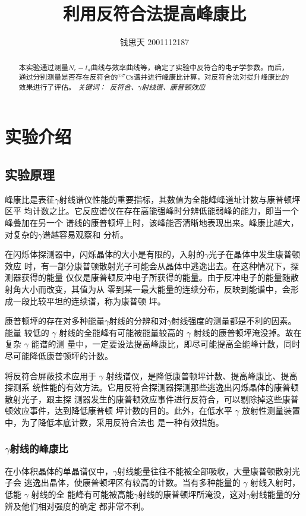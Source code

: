 \documentclass{article}
\title{利用反符合法提高峰康比}
\author{钱思天 2001112187}
\begin{document}
    \maketitle
    \begin{abstract}
        本实验通过测量$N_c-t_d$曲线与效率曲线等，确定了实验中反符合的电子学参数。而后，通过分别测量是否存在反符合的$^{137}\text{Cs}$谱并进行峰康比计算，对反符合法对提升峰康比的效果进行了评估。
        \newline
        \newline
        {\emph{ 关键词：\ 反符合、$\gamma$射线谱、康普顿效应 }\rm}

    \end{abstract}

    \section{实验介绍}
    \subsection{实验原理}
    峰康比是表征$\gamma$射线谱仪性能的重要指标，其数值为全能峰峰道址计数与康普顿坪区平 均计数之比。它反应谱仪在存在高能强峰时分辨低能弱峰的能力，即当一个峰叠加在另一个 谱线的康普顿坪上时，该峰能否清晰地表现出来。峰康比越大，对复杂的$\gamma$谱越容易观察和 分析。

在闪烁体探测器中，闪烁晶体的大小是有限的，入射的$\gamma$光子在晶体中发生康普顿效应 时，有一部分康普顿散射光子可能会从晶体中逃逸出去。在这种情况下，探测器获得的能量 仅仅是康普顿反冲电子所获得的能量。由于反冲电子的能量随散射角大小而改变，其值为从 零到某一最大能量的连续分布，反映到能谱中，会形成一段比较平坦的连续谱，称为康普顿 坪。

康普顿坪的存在对多种能量$\gamma$射线的分辨和对$\gamma$射线强度的测量都是不利的因素。能量 较低的 $\gamma$ 射线的全能峰有可能被能量较高的 $\gamma$ 射线的康普顿坪淹没掉。故在复杂 $\gamma$ 能谱的测 量中，一定要设法提高峰康比，即尽可能提高全能峰计数，同时尽可能降低康普顿坪的计数。

将反符合屏蔽技术应用于 $\gamma$ 射线谱仪，是降低康普顿坪计数、提高峰康比、提高探测系 统性能的有效方法。它用反符合探测器探测那些逃逸出闪烁晶体的康普顿散射光子，跟主探 测器发生的康普顿效应事件进行反符合，可以剔除掉这些康普顿效应事件，达到降低康普顿 坪计数的目的。此外，在低水平 $\gamma$ 放射性测量装置中，为了降低本底计数，采用反符合法也 是一种有效措施。
    \subsubsection{$\gamma$射线的峰康比}
    在小体积晶体的单晶谱仪中，$\gamma$射线能量往往不能被全部吸收，大量康普顿散射光子会
逃逸出晶体，使康普顿坪区有较高的计数。当有多种能量的 $\gamma$ 射线入射时，低能 $\gamma$ 射线的全 能峰有可能被高能$\gamma$射线的康普顿坪所淹没，这对$\gamma$射线能量的分辨及他们相对强度的确定 都非常不利。
\end{document}
